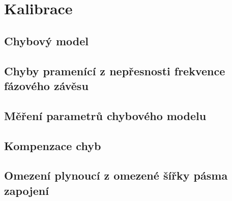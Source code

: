 \chapter{Kalibrace}

\section{Chybový model}

\section{Chyby pramenící z nepřesnosti frekvence fázového závěsu}

\section{Měření parametrů chybového modelu}

\section{Kompenzace chyb}

\section{Omezení plynoucí z omezené šířky pásma zapojení}